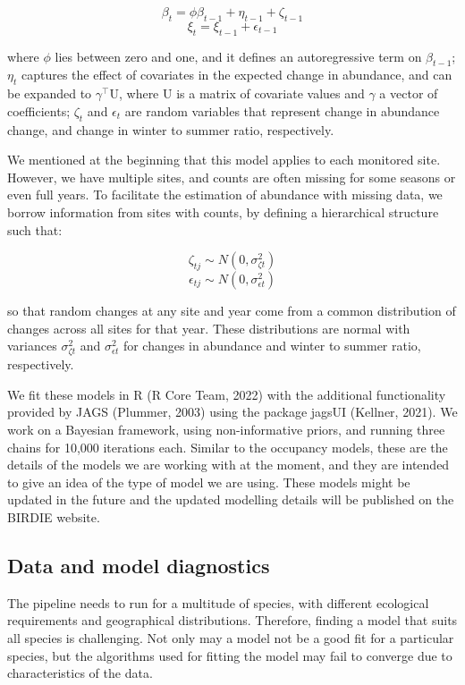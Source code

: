\documentclass[utf8]{frontiersSCNS}
\begin{document}
\[\beta_{t} = \phi\beta_{t-1} + \eta_{t-1} + \zeta_{t-1}\]
\[\xi_{t} = \xi_{t-1} + \epsilon_{t-1}\]

where \(\phi\) lies between zero and one, and it defines an
autoregressive term on \(\beta_{t-1}\); \(\eta_t\) captures the effect
of covariates in the expected change in abundance, and can be expanded
to \(\gamma^{\intercal}\mathrm{U}\), where \(\mathrm{U}\) is a matrix of
covariate values and \(\gamma\) a vector of coefficients; \(\zeta_t\)
and \(\epsilon_t\) are random variables that represent change in
abundance change, and change in winter to summer ratio, respectively.

We mentioned at the beginning that this model applies to each monitored
site. However, we have multiple sites, and counts are often missing for
some seasons or even full years. To facilitate the estimation of
abundance with missing data, we borrow information from sites with
counts, by defining a hierarchical structure such that:

\[\zeta_{tj} \sim N(0, \sigma^2_{\zeta t})\]
\[\epsilon_{tj} \sim N(0, \sigma^2_{\epsilon t})\]

so that random changes at any site and year come from a common
distribution of changes across all sites for that year. These
distributions are normal with variances \(\sigma^2_{\zeta t}\) and
\(\sigma^2_{\epsilon t}\) for changes in abundance and winter to summer
ratio, respectively.

We fit these models in R (R Core Team, 2022) with the additional
functionality provided by JAGS (Plummer, 2003) using the package jagsUI
(Kellner, 2021). We work on a Bayesian framework, using non-informative
priors, and running three chains for 10,000 iterations each. Similar to
the occupancy models, these are the details of the models we are working
with at the moment, and they are intended to give an idea of the type of
model we are using. These models might be updated in the future and the
updated modelling details will be published on the BIRDIE website.

\hypertarget{data-and-model-diagnostics}{%
\subsection*{Data and model
diagnostics}\label{data-and-model-diagnostics}}

The pipeline needs to run for a multitude of species, with different
ecological requirements and geographical distributions. Therefore,
finding a model that suits all species is challenging. Not only may a
model not be a good fit for a particular species, but the algorithms
used for fitting the model may fail to converge due to characteristics
of the data.
\end{document}
